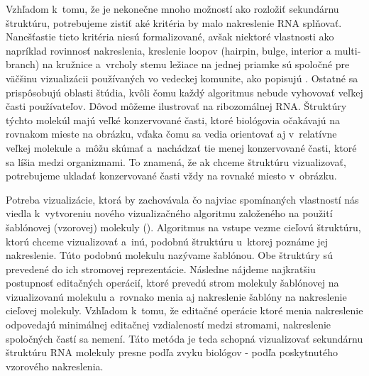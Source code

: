 Vzhľadom k~tomu, že je nekonečne mnoho možností ako rozložiť sekundárnu štruktúru,
potrebujeme zistiť aké kritéria by malo nakreslenie RNA splňovať. Nanešťastie
tieto kritéria niesú formalizované, avšak niektoré vlastnosti ako napríklad
rovinnosť nakreslenia, kreslenie loopov (hairpin, bulge, interior a multi-branch)
na kružnice a~vrcholy stemu ležiace na jednej priamke sú spoločné pre väčšinu
vizualizácii používaných vo vedeckej komunite, ako popisujú \citet{RNA_DRAW}.
Ostatné sa prispôsobujú oblasti štúdia, kvôli čomu každý algoritmus nebude
vyhovovať veľkej časti používateľov.
Dôvod môžeme ilustrovať na ribozomálnej RNA. Štruktúry týchto molekúl
majú veľké konzervované časti, ktoré biológovia očakávajú na rovnakom mieste
na obrázku, vďaka čomu sa vedia orientovať aj v~relatívne veľkej molekule
a~môžu skúmať a~nachádzať tie menej konzervované časti, ktoré sa líšia medzi organizmami.
To znamená, že ak chceme štruktúru vizualizovať, potrebujeme ukladať
konzervované časti vždy na rovnaké miesto v~obrázku.

Potreba vizualizácie, ktorá by zachovávala čo najviac spomínaných vlastností
nás viedla k~vytvoreniu nového vizualizačného algoritmu založeného
na použití šablónovej (vzorovej) molekuly (\citet{ELIAS_HOKSZA}).
Algoritmus na vstupe vezme cieľovú
štruktúru, ktorú chceme vizualizovať a~inú, podobnú štruktúru u~ktorej poznáme jej
nakreslenie. Túto podobnú molekulu nazývame šablónou. Obe štruktúry sú
prevedené do ich stromovej reprezentácie. Následne nájdeme najkratšiu postupnosť
editačných operácií, ktoré prevedú strom molekuly šablónovej na vizualizovanú
molekulu a~rovnako menia aj nakreslenie šablóny na nakreslenie cieľovej molekuly.
Vzhľadom k~tomu, že editačné operácie ktoré menia nakreslenie odpovedajú
minimálnej editačnej vzdialeností medzi stromami, nakreslenie spoločných častí sa nemení.
Táto metóda je teda schopná vizualizovať sekundárnu štruktúru RNA
molekuly presne podľa zvyku biológov - podľa poskytnutého vzorového nakreslenia.



